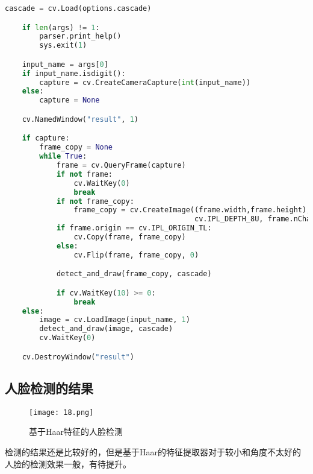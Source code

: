 \documentclass[openany]{ctexbook}
\begin{document}
{\begin{lstlisting}[language=python]
    cascade = cv.Load(options.cascade)

    if len(args) != 1:
        parser.print_help()
        sys.exit(1)

    input_name = args[0]
    if input_name.isdigit():
        capture = cv.CreateCameraCapture(int(input_name))
    else:
        capture = None

    cv.NamedWindow("result", 1)

    if capture:
        frame_copy = None
        while True:
            frame = cv.QueryFrame(capture)
            if not frame:
                cv.WaitKey(0)
                break
            if not frame_copy:
                frame_copy = cv.CreateImage((frame.width,frame.height),
                                            cv.IPL_DEPTH_8U, frame.nChannels)
            if frame.origin == cv.IPL_ORIGIN_TL:
                cv.Copy(frame, frame_copy)
            else:
                cv.Flip(frame, frame_copy, 0)

            detect_and_draw(frame_copy, cascade)

            if cv.WaitKey(10) >= 0:
                break
    else:
        image = cv.LoadImage(input_name, 1)
        detect_and_draw(image, cascade)
        cv.WaitKey(0)

    cv.DestroyWindow("result")
\end{lstlisting}}
\subsection{人脸检测的结果}
\begin{figure}[h]
  \centering
  \texttt{[image: 18.png]}
  \caption{基于Haar特征的人脸检测}
\end{figure}
检测的结果还是比较好的，但是基于Haar的特征提取器对于较小和角度不太好的人脸的检测效果一般，有待提升。
\end{document}
